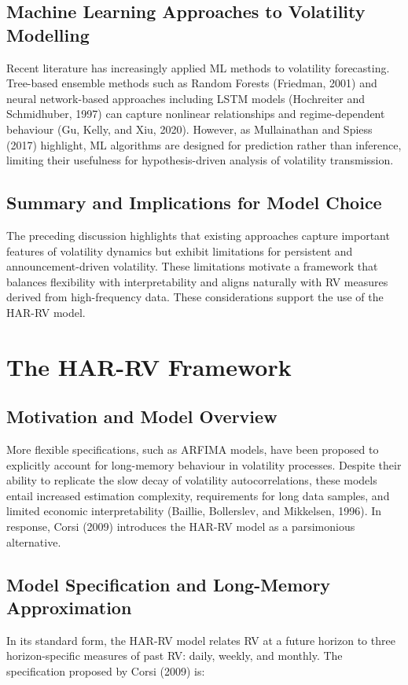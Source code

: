 \documentclass[12pt,a4paper]{report}
\begin{document}
\subsection{Machine Learning Approaches to Volatility Modelling}
Recent literature has increasingly applied ML methods to volatility forecasting. Tree-based ensemble methods such as Random Forests (Friedman, 2001) and neural network-based approaches including LSTM models (Hochreiter and Schmidhuber, 1997) can capture nonlinear relationships and regime-dependent behaviour (Gu, Kelly, and Xiu, 2020). However, as Mullainathan and Spiess (2017) highlight, ML algorithms are designed for prediction rather than inference, limiting their usefulness for hypothesis-driven analysis of volatility transmission.

\subsection{Summary and Implications for Model Choice}
The preceding discussion highlights that existing approaches capture important features of volatility dynamics but exhibit limitations for persistent and announcement-driven volatility. These limitations motivate a framework that balances flexibility with interpretability and aligns naturally with RV measures derived from high-frequency data. These considerations support the use of the HAR-RV model.

\section{The HAR-RV Framework}
\subsection{Motivation and Model Overview}
More flexible specifications, such as ARFIMA models, have been proposed to explicitly account for long-memory behaviour in volatility processes. Despite their ability to replicate the slow decay of volatility autocorrelations, these models entail increased estimation complexity, requirements for long data samples, and limited economic interpretability (Baillie, Bollerslev, and Mikkelsen, 1996). In response, Corsi (2009) introduces the HAR-RV model as a parsimonious alternative.

\subsection{Model Specification and Long-Memory Approximation}
In its standard form, the HAR-RV model relates RV at a future horizon to three horizon-specific measures of past RV: daily, weekly, and monthly. The specification proposed by Corsi (2009) is:
\end{document}
